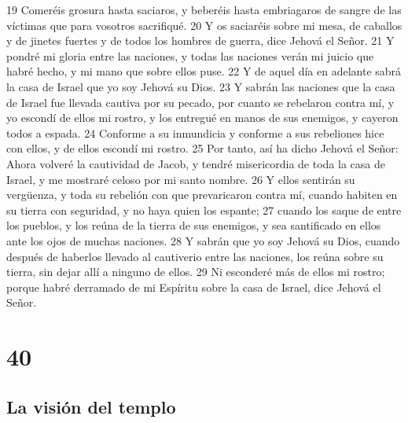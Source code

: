 19 Comeréis grosura hasta saciaros, y beberéis hasta embriagaros de sangre de las víctimas que para vosotros sacrifiqué.
20 Y os saciaréis sobre mi mesa, de caballos y de jinetes fuertes y de todos los hombres de guerra, dice Jehová el Señor. 
21 Y pondré mi gloria entre las naciones, y todas las naciones verán mi juicio que habré hecho, y mi mano que sobre ellos puse.
22 Y de aquel día en adelante sabrá la casa de Israel que yo soy Jehová su Dios.
23 Y sabrán las naciones que la casa de Israel fue llevada cautiva por su pecado, por cuanto se rebelaron contra mí, y yo escondí de ellos mi rostro, y los entregué en manos de sus enemigos, y cayeron todos a espada.
24 Conforme a su inmundicia y conforme a sus rebeliones hice con ellos, y de ellos escondí mi rostro.
25 Por tanto, así ha dicho Jehová el Señor: Ahora volveré la cautividad de Jacob, y tendré misericordia de toda la casa de Israel, y me mostraré celoso por mi santo nombre.
26 Y ellos sentirán su vergüenza, y toda su rebelión con que prevaricaron contra mí, cuando habiten en su tierra con seguridad, y no haya quien los espante;
27 cuando los saque de entre los pueblos, y los reúna de la tierra de sus enemigos, y sea santificado en ellos ante los ojos de muchas naciones.
28 Y sabrán que yo soy Jehová su Dios, cuando después de haberlos llevado al cautiverio entre las naciones, los reúna sobre su tierra, sin dejar allí a ninguno de ellos.
29 Ni esconderé más de ellos mi rostro; porque habré derramado de mi Espíritu sobre la casa de Israel, dice Jehová el Señor.

\chapter{40}

\section*{La visión del templo}

